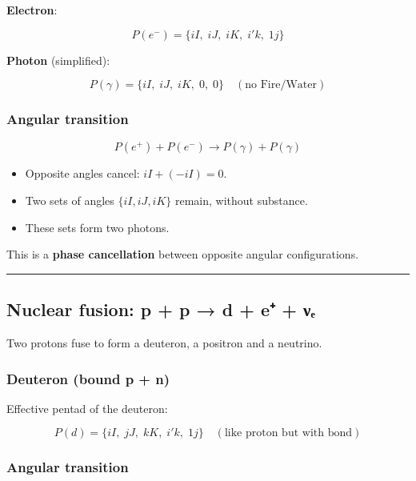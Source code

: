 \documentclass[11pt]{article}
\providecommand{\tightlist}{%
\setlength{\itemsep}{2pt}\setlength{\parskip}{6pt}
}
\begin{document}
\textbf{Electron}:

\[P(e^-) = \{ iI,\; iJ,\; iK,\; i'k,\; 1j \}\]

\textbf{Photon} (simplified):

\[P(\gamma) = \{ iI,\; iJ,\; iK,\; 0,\; 0 \} \quad (\text{no Fire/Water})\]

\hypertarget{angular-transition-1}{%
\subsubsection{Angular transition}\label{angular-transition-1}}

\[P(e^+) + P(e^-) \to P(\gamma) + P(\gamma)\]

\begin{itemize}
\tightlist
\item
  Opposite angles cancel: \(iI + (-iI) = 0\).
\item
  Two sets of angles \(\{iI, iJ, iK\}\) remain, without substance.
\item
  These sets form two photons.
\end{itemize}

This is a \textbf{phase cancellation} between opposite angular
configurations.

\begin{center}\rule{0.5\linewidth}{0.5pt}\end{center}

\hypertarget{nuclear-fusion-p-p-d-e-ux3bdux2091}{%
\subsection{Nuclear fusion: p + p → d + e⁺ +
νₑ}\label{nuclear-fusion-p-p-d-e-ux3bdux2091}}

Two protons fuse to form a deuteron, a positron and a neutrino.

\hypertarget{deuteron-bound-p-n}{%
\subsubsection{Deuteron (bound p + n)}\label{deuteron-bound-p-n}}

Effective pentad of the deuteron:

\[P(d) = \{ iI,\; jJ,\; kK,\; i'k,\; 1j \} \quad (\text{like proton but with bond})\]

\hypertarget{angular-transition-2}{%
\subsubsection{Angular transition}\label{angular-transition-2}}
\end{document}
